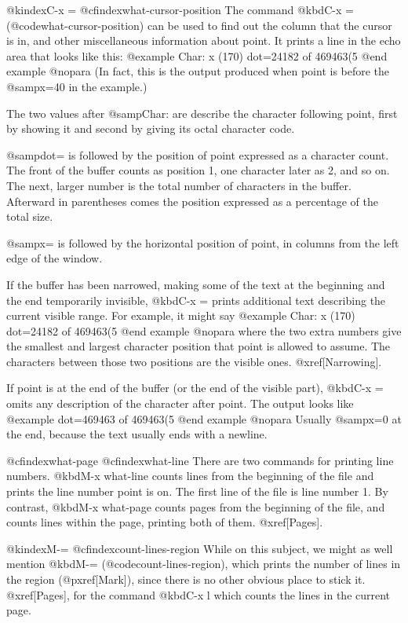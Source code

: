{{{{@kindex{C-x =}
@cfindex{what-cursor-position}
  The command @kbd{C-x =} (@code{what-cursor-position}) can be used to find out
the column that the cursor is in, and other miscellaneous information about
point.  It prints a line in the echo area that looks like this:
@example
Char: x (170)  dot=24182 of 469463(5%
@end example
@nopara
(In fact, this is the output produced when point is before the @samp{x=40}
in the example.)

  The two values after @samp{Char:} are describe the character following point,
first by showing it and second by giving its octal character code.

  @samp{dot=} is followed by the position of point expressed as a character count.
The front of the buffer counts as position 1, one character later as 2, and so on.
The next, larger number is the total number of characters in the buffer.
Afterward in parentheses comes the position expressed as a percentage of the
total size.

  @samp{x=} is followed by the horizontal position of point, in columns from the
left edge of the window.

  If the buffer has been narrowed, making some of the text at the beginning and
the end temporarily invisible, @kbd{C-x =} prints additional text describing the
current visible range.  For example, it might say
@example
Char: x (170)  dot=24182 of 469463(5%
@end example
@nopara
where the two extra numbers give the smallest and largest character position
that point is allowed to assume.  The characters between those two positions
are the visible ones.  @xref[Narrowing].

  If point is at the end of the buffer (or the end of the visible part),
@kbd{C-x =} omits any description of the character after point.
The output looks like
@example
dot=469463 of 469463(5%
@end example
@nopara
Usually @samp{x=0} at the end, because the text usually ends with a newline.

@cfindex{what-page}
@cfindex{what-line}
  There are two commands for printing line numbers.  @kbd{M-x what-line}
counts lines from the beginning of the file and prints the line number
point is on.  The first line of the file is line number 1.  By contrast,
@kbd{M-x what-page} counts pages from the beginning of the file, and
counts lines within the page, printing both of them.  @xref[Pages].

@kindex{M-=}
@cfindex{count-lines-region}
  While on this subject, we might as well mention @kbd{M-=}
(@code{count-lines-region}), which prints the number of lines in the region
(@pxref[Mark]), since there is no other obvious place to stick it.
@xref[Pages], for the command @kbd{C-x l} which counts the lines in the
current page.

}}}}
